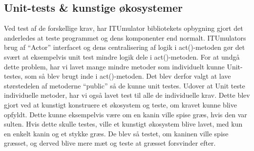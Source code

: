 \documentclass[12pt]{article}
\begin{document}
    \subsection{Unit-tests \& kunstige økosystemer}
    Ved test af de forskellige krav, har ITUmulator bibliotekets opbygning gjort det anderledes at teste programmet og dens komponenter end normalt. ITUmulators brug af “Actor” interfacet og dens centralisering af logik i act()-metoden gør det svært at eksempelvis unit test mindre logik dele i act()-metoden. For at undgå dette problem, har vi lavet mange mindre metoder som individuelt kunne Unit-testes, som så blev brugt inde i act()-metoden. Det blev derfor valgt at lave størstedelen af metoderne “public” så de kunne unit testes. Udover at Unit teste individuelle metoder, har vi også lavet test til alle de individuelle krav. Dette blev gjort ved at kunstigt konstruere et økosystem og teste, om kravet kunne blive opfyldt. Dette kunne eksempelvis være om en kanin ville spise græs, hvis den var sulten. Hvis dette skulle testes, ville et kunstigt økosystem blive lavet, med kun en enkelt kanin og et stykke græs. De blev så testet, om kaninen ville spise græsset, og derved blive mere mæt og teste at græsset forsvinder efter.
\end{document}

